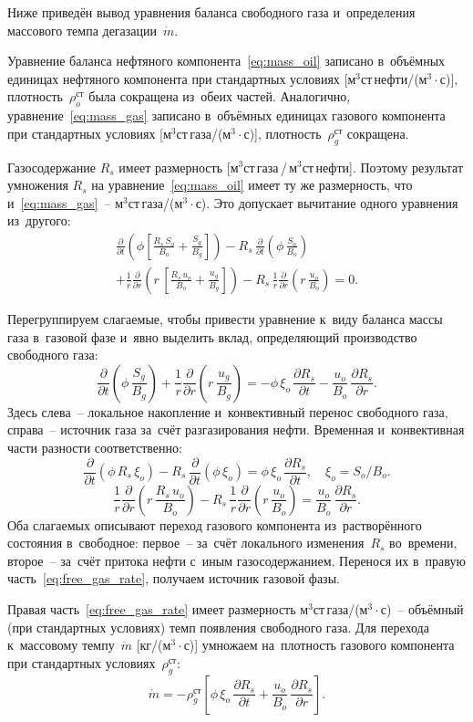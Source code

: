 \documentclass[12pt,a4paper]{article}
\newcommand{\divr}[1]{\frac{1}{r}\frac{\partial}{\partial r}\!\left(r\,#1\right)}
\newcommand{\pdt}[1]{\frac{\partial #1}{\partial t}}
\newcommand{\pdr}[1]{\frac{\partial #1}{\partial r}}
\newcommand{\xio}{\xi_o}
\newcommand{\mdot}{\dot{m}}
\begin{document}
Ниже приведён вывод уравнения баланса свободного газа
и~определения массового темпа дегазации~$\mdot$.

Уравнение баланса нефтяного компонента~\eqref{eq:mass_oil} записано
в~объёмных единицах нефтяного компонента при стандартных условиях
[м$^3$ст\,нефти/(м$^3\cdot$с)], плотность~$\rho_o^{\text{ст}}$
была сокращена из~обеих частей. Аналогично,
уравнение~\eqref{eq:mass_gas} записано в~объёмных единицах газового
компонента при стандартных условиях [м$^3$ст\,газа/(м$^3\cdot$с)],
плотность~$\rho_g^{\text{ст}}$ сокращена.

Газосодержание $R_s$ имеет размерность
[м$^3$ст\,газа\,/\,м$^3$ст\,нефти]. Поэтому результат умножения
$R_s$ на уравнение~\eqref{eq:mass_oil} имеет ту же размерность, что
и~\eqref{eq:mass_gas}~-- м$^3$ст\,газа/(м$^3\cdot$с). Это
допускает вычитание одного уравнения из~другого:
\begin{multline}\label{eq:gas_minus_Rs_oil}
  \pdt{}\!\left(\phi\!\left[
    \frac{R_s\,S_o}{B_o} + \frac{S_g}{B_g}
  \right]\right)
  - R_s\,\pdt{}\!\left(\phi\,\frac{S_o}{B_o}\right)
  \\
  + \divr{\left[
    \frac{R_s\,u_o}{B_o} + \frac{u_g}{B_g}
  \right]}
  - R_s\,\divr{\frac{u_o}{B_o}} = 0.
\end{multline}

Перегруппируем слагаемые, чтобы привести уравнение к~виду
баланса массы газа в~газовой фазе и~явно выделить вклад,
определяющий производство свободного газа:
\begin{equation}\label{eq:free_gas_rate}
  \boxed{
    \pdt{}\!\left(\phi\,\frac{S_g}{B_g}\right)
    + \divr{\frac{u_g}{B_g}}
    = -\phi\,\xio\,\pdt{R_s}
      - \frac{u_o}{B_o}\,\pdr{R_s}.
  }
\end{equation}
Здесь слева~-- локальное накопление и~конвективный
перенос свободного газа, справа~-- источник газа за~счёт
разгазирования нефти.
Временная и~конвективная части разности соответственно:
\[
  \pdt{}\!\left(\phi\,R_s\,\xio\right)
  - R_s\,\pdt{}\!\left(\phi\,\xio\right)
  = \phi\,\xio\,\pdt{R_s}, \quad \xio = S_o/B_o.
\]
\[
  \divr{\frac{R_s\,u_o}{B_o}}
  - R_s\,\divr{\frac{u_o}{B_o}}
  = \frac{u_o}{B_o}\,\pdr{R_s}.
\]
Оба слагаемых описывают переход газового компонента из~растворённого
состояния в~свободное: первое~-- за~счёт локального изменения~$R_s$
во~времени, второе~-- за~счёт притока нефти с~иным газосодержанием.
Перенося их в~правую часть~\eqref{eq:free_gas_rate}, получаем
источник газовой фазы.

Правая часть~\eqref{eq:free_gas_rate} имеет размерность
м$^3$ст\,газа/(м$^3\cdot$с)~-- объёмный (при стандартных
условиях) темп появления свободного газа. Для перехода к~массовому
темпу~$\mdot$ [кг/(м$^3\cdot$с)] умножаем на~плотность газового
компонента при стандартных условиях~$\rho_g^{\text{ст}}$:
\begin{equation}\label{eq:mdot}
  \boxed{
    \mdot = -\rho_g^{\text{ст}}\!\left[
      \phi\,\xio\,\pdt{R_s}
      + \frac{u_o}{B_o}\,\pdr{R_s}
    \right].
  }
\end{equation}
\end{document}
